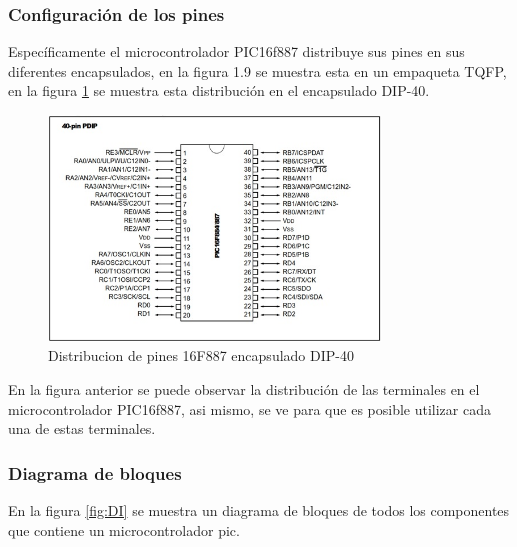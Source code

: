 \documentclass[12pt,a4paper]{article}
\begin{document}
   \subsubsection{Configuración de los pines}
   Específicamente el microcontrolador PIC16f887 distribuye sus pines en sus diferentes encapsulados, en la figura 1.9 se muestra esta en un empaqueta TQFP, en la figura \ref{fig:DIP} se muestra esta distribución en el encapsulado DIP-40.
   
   \begin{figure}[htpb]
   \centering
   \includegraphics[height=6cm]{PIC16}
   \caption{Distribucion de pines 16F887 encapsulado DIP-40}
   \label{fig:DIP}
   \end{figure}
   
   En la figura anterior se puede observar la distribución de las terminales en el microcontrolador PIC16f887, asi mismo, se ve para que es posible utilizar cada una de estas terminales.
   
   \subsubsection{Diagrama de bloques}
   En la figura \ref{fig:DI} se muestra un diagrama de bloques de todos los componentes que contiene un microcontrolador pic.
   
\end{document}
